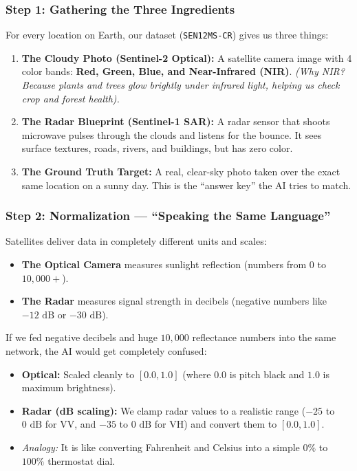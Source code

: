 \documentclass[11pt,a4paper]{article}
\begin{document}
\subsubsection*{Step 1: Gathering the Three Ingredients}
For every location on Earth, our dataset (\texttt{SEN12MS-CR}) gives us three things:
\begin{enumerate}[leftmargin=1.5em]
    \item \textbf{The Cloudy Photo (Sentinel-2 Optical):} A satellite camera image with 4 color bands: \textbf{Red, Green, Blue, and Near-Infrared (NIR)}. \textit{(Why NIR? Because plants and trees glow brightly under infrared light, helping us check crop and forest health).}
    \item \textbf{The Radar Blueprint (Sentinel-1 SAR):} A radar sensor that shoots microwave pulses through the clouds and listens for the bounce. It sees surface textures, roads, rivers, and buildings, but has zero color.
    \item \textbf{The Ground Truth Target:} A real, clear-sky photo taken over the exact same location on a sunny day. This is the ``answer key'' the AI tries to match.
\end{enumerate}

\subsubsection*{Step 2: Normalization --- ``Speaking the Same Language''}
Satellites deliver data in completely different units and scales:
\begin{itemize}[leftmargin=1.5em]
    \item \textbf{The Optical Camera} measures sunlight reflection (numbers from $0$ to $10,000+$).
    \item \textbf{The Radar} measures signal strength in decibels (negative numbers like $-12\text{ dB}$ or $-30\text{ dB}$).
\end{itemize}
If we fed negative decibels and huge $10,000$ reflectance numbers into the same network, the AI would get completely confused:
\begin{itemize}[leftmargin=1.5em]
    \item \textbf{Optical:} Scaled cleanly to $[0.0, 1.0]$ (where $0.0$ is pitch black and $1.0$ is maximum brightness).
    \item \textbf{Radar (dB scaling):} We clamp radar values to a realistic range ($-25$ to $0\text{ dB}$ for VV, and $-35$ to $0\text{ dB}$ for VH) and convert them to $[0.0, 1.0]$.
    \item \textit{Analogy:} It is like converting Fahrenheit and Celsius into a simple $0\%$ to $100\%$ thermostat dial.
\end{itemize}
\end{document}
